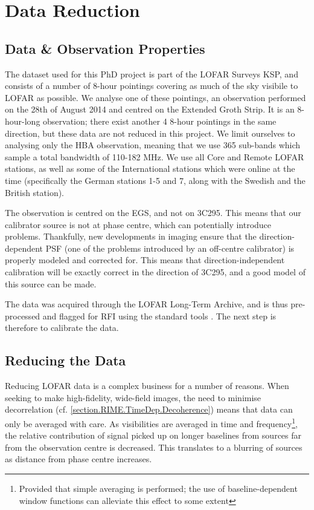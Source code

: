 \section{Data Reduction}


\subsection{Data \& Observation Properties}
\pg
The dataset used for this PhD project is part of the LOFAR Surveys KSP, and consists of a number of 8-hour pointings covering as much of the sky visibile to LOFAR as possible. We analyse one of these pointings, an observation performed on the 28th of August 2014 and centred on the Extended Groth Strip. It is an 8-hour-long observation; there exist another 4 8-hour pointings in the same direction, but these data are not reduced in this project. We limit ourselves to analysing only the HBA observation, meaning that we use 365 sub-bands which sample a total bandwidth of 110-182 MHz. We use all Core and Remote LOFAR stations, as well as some of the International stations which were online at the time (specifically the German stations 1-5 and 7, along with the Swedish and the British station).

\pg
The observation is centred on the EGS, and not on 3C295. This means that our calibrator source is not at phase centre, which can potentially introduce problems. Thankfully, new developments in imaging  ensure that the direction-dependent PSF (one of the problems introduced by an off-centre calibrator) is properly modeled and corrected for. This means that direction-independent calibration will be exactly correct in the direction of 3C295, and a good model of this source can be made.

\pg
The data was acquired through the LOFAR Long-Term Archive, and is thus pre-processed and flagged for RFI using the standard tools . The next step is therefore to calibrate the data.

\subsection{Reducing the Data}

\pg
Reducing LOFAR data is a complex business for a number of reasons. When seeking to make high-fidelity, wide-field images, the need to minimise decorrelation (cf. \cref{section.RIME.TimeDep.Decoherence}) means that data can only be averaged with care. As visibilities are averaged in time and frequency\footnote{Provided that simple averaging is performed; the use of baseline-dependent window functions can alleviate this effect to some extent}, the relative contribution of signal picked up on longer baselines from sources far from the observation centre is decreased. This translates to a blurring of sources as distance from phase centre increases.

